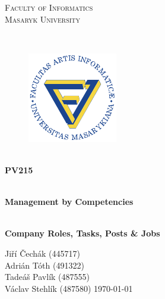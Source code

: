 \documentclass[11pt,a4paper]{article}
\begin{document}
\begin{titlepage}

    \begin{center}
        \vfill {%
            \Huge{%
                \textsc{%
                    Faculty of Informatics\\[3mm]%
                    Masaryk University%
                }%
            }%
        }%

        \hfill\\[15mm]

        \begin{figure}[!h]
            \centering
            \includegraphics[scale=3]{muni-fi-logo.pdf}
        \end{figure}

        \hfill\\[10mm]

        \Huge{
            \textbf{
                PV215
            }
        }

        \hfill\\[-10mm]

        \huge{
            \textbf{
                Management by Competencies
            }
        }

        \hfill\\[10mm]

        \LARGE{
            \textbf{
                Company Roles, Tasks, Posts \& Jobs
            }
        }
        \vfill

    \end{center}

        \Large{
            Jiří Čechák (445717)\\
            Adrián Tóth (491322)\\
            Tadeáš Pavlík (487555)\\
            Václav Stehlík (487580) \hfill \today
        }

\end{titlepage}

\setlength{\parskip}{0pt}
    \hypersetup{hidelinks}\tableofcontents
\setlength{\parskip}{0pt}
\end{document}
